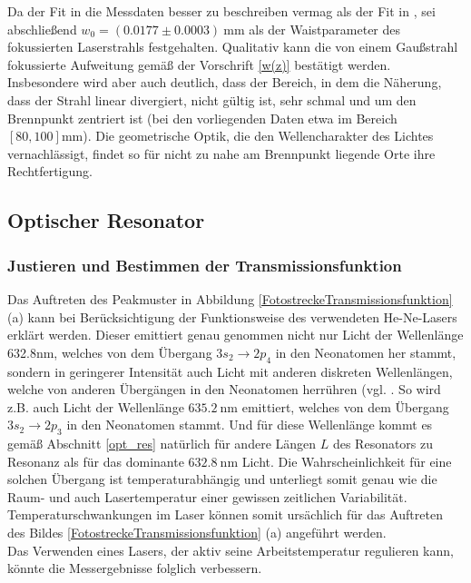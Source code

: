 \documentclass[11pt,a4paper,oneside]{scrartcl}
\begin{document}
Da der Fit in  die Messdaten besser zu beschreiben vermag als  der Fit in , sei abschließend $w_0=(0.0177\pm0.0003)\ \mathrm{mm}$ als der Waistparameter des fokussierten Laserstrahls festgehalten. Qualitativ kann die von einem Gaußstrahl fokussierte Aufweitung gemäß der Vorschrift \ref{w(z)} bestätigt werden. Insbesondere wird aber auch deutlich, dass der Bereich, in dem die Näherung, dass der Strahl linear divergiert, nicht gültig ist, sehr schmal und um den Brennpunkt zentriert ist (bei den vorliegenden Daten etwa im Bereich $[80,100]\mathrm{mm}$). Die geometrische Optik, die den Wellencharakter des Lichtes vernachlässigt, findet so für nicht zu nahe am Brennpunkt liegende Orte ihre Rechtfertigung. 
\subsection{Optischer Resonator}
\subsubsection{Justieren und Bestimmen der Transmissionsfunktion}
Das Auftreten des Peakmuster in Abbildung \ref{FotostreckeTransmissionsfunktion} (a) kann bei Berücksichtigung der Funktionsweise des verwendeten He-Ne-Lasers erklärt werden. Dieser emittiert genau genommen nicht nur Licht der
Wellenlänge 632.8nm, welches von dem Übergang $3s_2 \rightarrow 2p_4$ in den Neonatomen her stammt, sondern in geringerer Intensität auch Licht mit anderen diskreten Wellenlängen, welche von anderen Übergängen in den
Neonatomen herrühren (vgl. \cite{dewiki:221382741}. So wird z.B. auch Licht der Wellenlänge $635.2\ \mathrm{nm}$ emittiert, welches von dem Übergang $3s_2 \rightarrow 2p_3$ in den Neonatomen stammt. Und für diese Wellenlänge kommt es gemäß Abschnitt \ref{opt_res} natürlich für
andere Längen $L$ des Resonators zu Resonanz als für das dominante $632.8\ \mathrm{nm}$ Licht. Die Wahrscheinlichkeit für eine solchen Übergang ist temperaturabhängig und unterliegt somit genau wie die Raum- und auch Lasertemperatur einer gewissen zeitlichen Variabilität. Temperaturschwankungen im Laser können somit ursächlich für das Auftreten des Bildes \ref{FotostreckeTransmissionsfunktion} (a) angeführt werden.\\
Das Verwenden eines Lasers, der aktiv seine Arbeitstemperatur regulieren kann, könnte die Messergebnisse folglich verbessern.
\end{document}
